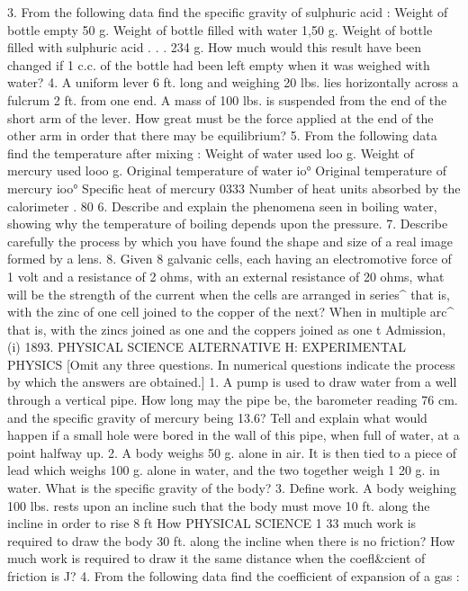 3. From the following data find the specific gravity of sulphuric acid :
Weight of bottle empty 50 g.
Weight of bottle filled with water 1,50 g.
Weight of bottle filled with sulphuric acid . . . 234 g.
How much would this result have been changed if 1 c.c. of the bottle had been left empty when it was weighed with water?
4. A uniform lever 6 ft. long and weighing 20 lbs. lies horizontally across a fulcrum 2 ft. from one end. A mass of 100 lbs. is suspended from the end of the short arm of the lever. How great must be the force applied at the end of the other arm in order that there may be equilibrium?
5. From the following data find the temperature after mixing :
Weight of water used loo g.
Weight of mercury used looo g.
Original temperature of water io°
Original temperature of mercury ioo°
Specific heat of mercury 0333
Number of heat units absorbed by the calorimeter . 80
6. Describe and explain the phenomena seen in boiling water, showing why the temperature of boiling depends upon the pressure.
7. Describe carefully the process by which you have found the shape and size of a real image formed by a lens.
8. Given 8 galvanic cells, each having an electromotive force of 1 volt and a resistance of 2 ohms, with an external resistance of 20 ohms, what will be the strength of the current when the cells are arranged in series^ that is, with the zinc of one cell joined to the copper of the next? When in multiple arc^ that is, with the zincs joined as one and the coppers joined as one t
Admission, (i) 1893.
PHYSICAL SCIENCE
ALTERNATIVE H: EXPERIMENTAL PHYSICS
[Omit any three questions. In numerical questions indicate the process by which the answers are obtained.]
1. A pump is used to draw water from a well through a vertical pipe. How long may the pipe be, the barometer reading 76 cm. and the specific gravity of mercury being 13.6? Tell and explain what would happen if a small hole were bored in the wall of this pipe, when full of water, at a point halfway up.
2. A body weighs 50 g. alone in air. It is then tied to a piece of lead which weighs 100 g. alone in water, and the two together weigh 1 20 g. in water. What is the specific gravity of the body?
3. Define work.
A body weighing 100 lbs. rests upon an incline such that the body must move 10 ft. along the incline in order to rise 8 ft How
PHYSICAL SCIENCE 1 33
much work is required to draw the body 30 ft. along the incline when there is no friction? How much work is required to draw it the same distance when the coefl&cient of friction is J?
4. From the following data find the coefficient of expansion of a gas :
